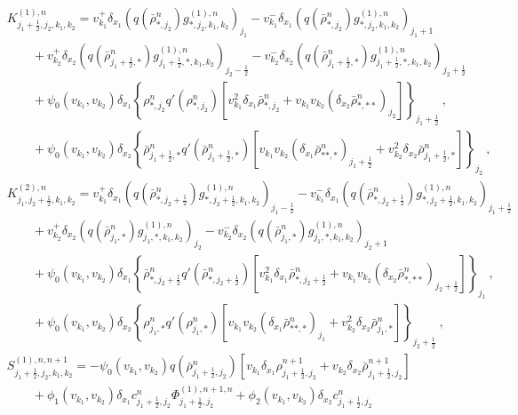 \documentclass[review,onefignum,onetabnum]{siamart220329}
\begin{document}
\begin{align*}
    & K_{j_1+\frac12,j_2,k_1, k_2}^{(1),n}  = v_{k_1}^+\delta_{x_1}(q( {\bar{\rho}}_{*,j_2}^n) g_{*,j_2,k_1,k_2}^{(1),n})_{j_1} - v_{k_1}^-\delta_{x_1}(q( {\bar{\rho}}_{*,j_2}^n) g_{*,j_2,k_1,k_2}^{(1),n})_{j_1+1}\\
    & \qquad + v_{k_2}^+\delta_{x_2}(q( {\bar{\rho}}_{j_1+\frac12,*}^n) g_{j_1+\frac12, *,k_1,k_2}^{(1),n})_{j_2-\frac12} - v_{k_2}^-\delta_{x_2}(q( {\bar{\rho}}_{j_1+\frac12,*}^n) g_{j_1+\frac12,*,k_1,k_2}^{(1),n})_{j_2+\frac12} \\
    &\qquad + \psi_{0}(v_{k_1}, v_{k_2})\delta_{x_1}\left\{ {\rho}_{*,j_2}^n q'( {\rho}_{*,j_2}^n)\left[v_{k_1}^2\delta_{x_1}\bar{\rho}_{*,j_2}^n + v_{k_1}v_{k_2}(\delta_{x_2}\bar{\rho}_{*,**}^n)_{j_2} \right]\right\}_{j_1+\frac12}\ , \\
    &\qquad + \psi_{0}(v_{k_1}, v_{k_2})\delta_{x_2}\left\{ {\bar{\rho}}_{j_1+\frac12,*}^n q'( {\bar{\rho}}_{j_1+\frac12,*}^n)\left[v_{k_1}v_{k_2}(\delta_{x_1}\bar{\rho}_{**,*}^n)_{j_1+\frac12} + v_{k_2}^2 \delta_{x_2}\bar{\rho}_{j_1+\frac12,*}^n\right]\right\}_{j_2}\ , \\
    & K_{j_1,j_2+\frac12,k_1, k_2}^{(2),n}  = v_{k_1}^+\delta_{x_1}(q( {\bar{\rho}}_{*,j_2+\frac12}^n) g_{*,j_2+\frac12,k_1,k_2}^{(1),n})_{j_1-\frac12} - v_{k_1}^-\delta_{x_1}(q( {\bar{\rho}}_{*,j_2+\frac12}^n) g_{*,j_2+\frac12,k_1,k_2}^{(1),n})_{j_1+\frac12}\\
    & \qquad + v_{k_2}^+\delta_{x_2}(q( {\bar{\rho}}_{j_1,*}^n) g_{j_1, *,k_1,k_2}^{(1),n})_{j_2} - v_{k_2}^-\delta_{x_2}(q( {\bar{\rho}}_{j_1,*}^n) g_{j_1,*,k_1,k_2}^{(1),n})_{j_2+1} \\
    &\qquad + \psi_{0}(v_{k_1}, v_{k_2})\delta_{x_1}\left\{ {\bar{\rho}}_{*,j_2+\frac12}^n q'( {\bar{\rho}}_{*,j_2+\frac12}^n)\left[v_{k_1}^2\delta_{x_1}\bar{\rho}_{*,j_2+\frac12}^n + v_{k_1}v_{k_2}(\delta_{x_2}\bar{\rho}_{*,**}^n)_{j_2+\frac12} \right]\right\}_{j_1}\ , \\
    &\qquad + \psi_{0}(v_{k_1}, v_{k_2})\delta_{x_2}\left\{ {\rho}_{j_1,*}^n q'( {\rho}_{j_1,*}^n)\left[v_{k_1}v_{k_2}(\delta_{x_1}\bar{\rho}_{**,*}^n)_{j_1} + v_{k_2}^2 \delta_{x_2}\bar{\rho}_{j_1,*}^n \right]\right\}_{j_2+\frac12}\ , \\
    & S_{j_1+\frac12, j_2, k_1, k_2}^{(1), n, n+1} = -\psi_{0}(v_{k_1}, v_{k_2})q( \bar{{\rho}}_{j_1+\frac12,j_2}^n)  \left[v_{k_1} \delta_{x_1} \rho_{j_1+\frac12, j_2}^{n+1} + v_{k_2} \delta_{x_2} \bar{\rho}_{j_1+\frac12, j_2}^{n+1} \right] \\
    & \qquad  + \phi_{1}(v_{k_1}, v_{k_2})\delta_{x_1} c_{j_1+\frac12,j_2}^n \Phi^{(1),n+1,n}_{j_1+\frac12,j_2}+\phi_{2}(v_{k_1}, v_{k_2}) \delta_{x_2} c_{j_1+\frac12,j_2}^n

\end{align*}
\end{document}

